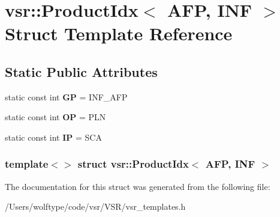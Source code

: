 \hypertarget{structvsr_1_1_product_idx_3_01_a_f_p_00_01_i_n_f_01_4}{\section{vsr\-:\-:Product\-Idx$<$ A\-F\-P, I\-N\-F $>$ Struct Template Reference}
\label{structvsr_1_1_product_idx_3_01_a_f_p_00_01_i_n_f_01_4}
}
\subsection*{Static Public Attributes}
\begin{DoxyCompactItemize}
\item 
\hypertarget{structvsr_1_1_product_idx_3_01_a_f_p_00_01_i_n_f_01_4_a22bcb1d51811e99aaa2aaba043c4cb46}{static const int {\bfseries G\-P} = I\-N\-F\-\_\-\-A\-F\-P}\label{structvsr_1_1_product_idx_3_01_a_f_p_00_01_i_n_f_01_4_a22bcb1d51811e99aaa2aaba043c4cb46}

\item 
\hypertarget{structvsr_1_1_product_idx_3_01_a_f_p_00_01_i_n_f_01_4_abe9a7979c4b85a9440d7f09c404fec08}{static const int {\bfseries O\-P} = P\-L\-N}\label{structvsr_1_1_product_idx_3_01_a_f_p_00_01_i_n_f_01_4_abe9a7979c4b85a9440d7f09c404fec08}

\item 
\hypertarget{structvsr_1_1_product_idx_3_01_a_f_p_00_01_i_n_f_01_4_aed0fd5fba054c40367b3f93be66ab0a7}{static const int {\bfseries I\-P} = S\-C\-A}\label{structvsr_1_1_product_idx_3_01_a_f_p_00_01_i_n_f_01_4_aed0fd5fba054c40367b3f93be66ab0a7}

\end{DoxyCompactItemize}
\subsubsection*{template$<$$>$ struct vsr\-::\-Product\-Idx$<$ A\-F\-P, I\-N\-F $>$}



The documentation for this struct was generated from the following file\-:\begin{DoxyCompactItemize}
\item 
/\-Users/wolftype/code/vsr/\-V\-S\-R/vsr\-\_\-templates.\-h\end{DoxyCompactItemize}
